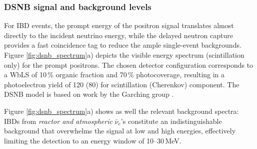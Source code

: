 \subsubsection{DSNB signal and background levels}

For IBD events, the prompt energy of the positron signal translates almost directly to the incident neutrino energy, while the delayed neutron capture provides a fast coincidence tag to reduce the ample single-event backgrounds. Figure \ref{fig:dsnb_spectrum}a) depicts the visible energy spectrum (scintillation only) for the prompt positrons. The chosen detector configuration corresponds to a WbLS of 10\,\% organic fraction and 70\,\% photocoverage, resulting in a photoelectron yield of 120 (80) for scintillation (Cherenkov) component. The DSNB model is based on work by the Garching group \cite{}. 

Figure \ref{fig:dsnb_spectrum}a) shows as well the relevant background spectra: IBDs from {\it reactor and atmospheric} $\bar\nu_e$'s constitute an indistinguishable background that overwhelms the signal at low and high energies, effectively limiting the detection to an energy window of 10--30\,MeV. 






